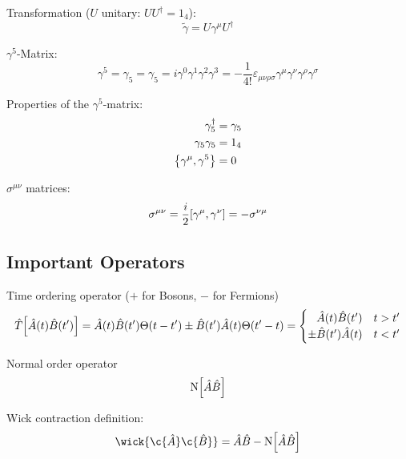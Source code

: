 			\noindent
			Transformation ($U$ unitary: $U U^\dagger=1_4$):
			\begin{equation}
				\tilde{\gamma} = U \gamma^\mu U^\dagger
			\end{equation}

			\noindent
			$\gamma^5$-Matrix:
			\begin{equation}
				\gamma^5 = \gamma_5 = \gamma_5 = i\gamma^0 \gamma^1 \gamma^2 \gamma^3 = -\frac{1}{4!}\varepsilon_{\mu\nu\rho\sigma} \gamma^\mu \gamma^\nu \gamma^\rho \gamma^\sigma
			\end{equation}

			\noindent
			Properties of the $\gamma^5$-matrix:
			\begin{equation}
				\begin{aligned}
					\gamma_5^\dagger &= \gamma_5 \\
					\gamma_5 \gamma_5 &= 1_4 \\
					\acomm{\gamma^\mu}{\gamma^5} &= 0 \\
				\end{aligned}
			\end{equation}

			\noindent
			$\sigma^{\mu\nu}$ matrices:
			\begin{equation}
				\sigma^{\mu\nu} = \frac{i}{2}\comm{\gamma^\mu}{\gamma^\nu} = -\sigma^{\nu\mu}
			\end{equation}

	\subsection{Important Operators}
		Time ordering operator ($+$ for Bosons, $-$ for Fermions)
		\begin{equation}
			\hat{T}\qty[\hat{A}(t)\hat{B}(t')]
				= \hat{A}(t) \hat{B}(t') \Theta(t-t') \pm \hat{B}(t') \hat{A}(t) \Theta(t'-t)
				= \begin{cases}
					\phantom{\pm} \hat{A}(t) \hat{B}(t') & t>t' \\
					\pm \hat{B}(t') \hat{A}(t) & t<t'
				\end{cases}
		\end{equation}

		\noindent
		Normal order operator
		\begin{equation}
			\mathrm{N}\qty[\hat{A}\hat{B}]
		\end{equation}

		\noindent
		Wick contraction definition:
		\begin{equation}
			\wick{\c{\hat{A}} \c{\hat{B}}} = \hat{A}\hat{B} - \NormalOrder{\hat{A}\hat{B}}
		\end{equation}

